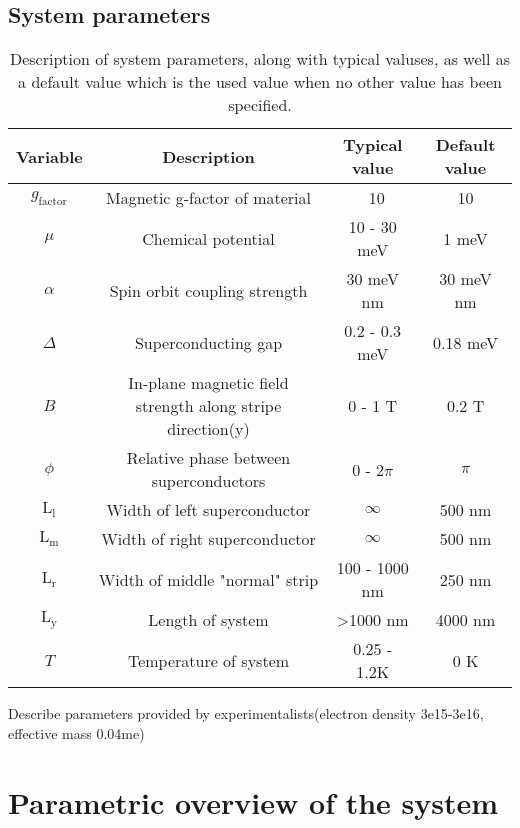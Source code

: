 \documentclass[10pt,a4paper]{article}
\begin{document}
	\subsection{System parameters}
	\begin{table}
		\begin{tabular}{|c|c|c|c|}
			\hline 
			Variable & Description & Typical value & Default value \\ 
			\hline 
			$g_\text{factor}$ & Magnetic g-factor of material & ~10 & 10 \\ 
			\hline 
			$\mu$ & Chemical potential &  10 - 30 meV & 1 meV\\ 
			\hline 
			$\alpha$ & Spin orbit coupling strength &  30 meV nm & 30 meV nm \\ 
			\hline 
			$\Delta$ & Superconducting gap & 0.2 - 0.3 meV & 0.18 meV\\ 
			\hline 
			$B$ & In-plane magnetic field strength along stripe direction(y) & 0 - 1 T & 0.2 T \\ 
			\hline 
			$\phi$ & Relative phase between superconductors &  0 - 2$\pi$ & $\pi$\\ 
			\hline 
			$\text{L}_\text{l}$ & Width of left superconductor & $\infty$ & 500 nm \\
			\hline 
			$\text{L}_\text{m}$ & Width of right superconductor & $\infty$ & 500 nm \\
			\hline
			$\text{L}_\text{r}$ & Width of middle "normal" strip & 100 - 1000 nm & 250 nm \\
			\hline
			$\text{L}_\text{y}$ & Length of system & \textgreater1000 nm & 4000 nm\\
			\hline
			$T$ & Temperature of system & 0.25 - 1.2K & 0 K\\
			\hline
		\end{tabular} 
	\caption{Description of system parameters, along with typical valuses, as well as a default value which is the used value when no other value has been specified.}
	\label{tbl:system_pars}
	\end{table}
	Describe parameters provided by experimentalists(electron density 3e15-3e16, effective mass 0.04me)
\section{Parametric overview of the system}
\end{document}
